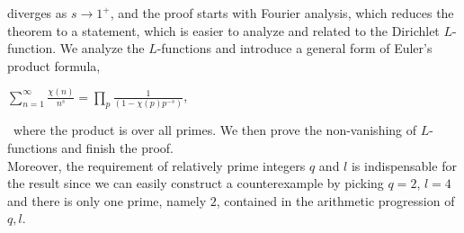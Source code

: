 \documentclass[psamsfonts]{amsart}
\theoremstyle{definition}
\theoremstyle{remark}
\numberwithin{equation}{section}
\begin{document}
		 diverges as $s \rightarrow 1^+$, and the proof starts with Fourier analysis, which reduces the theorem to a statement, which is easier to analyze and related to the Dirichlet $L$-function. We analyze the $L$-functions and introduce a general form of Euler's product formula,
		 \begin{center}
		 	$\sum_{n=1}^{\infty} \frac{\chi(n)}{n^s} = \prod_{p} \frac{1}{(1-\chi(p)p^{-s})}$,
		 \end{center}\
		 where the product is over all primes.
		  We then prove the non-vanishing of $L$-functions and finish the proof.\\
		Moreover, the requirement of relatively prime integers $q$ and $l$ is indispensable for the result since we can easily construct a counterexample by picking $q=2$, $l=4$ and there is only one prime, namely $2$, contained in the arithmetic progression of $q,l$.
		
\end{document}
